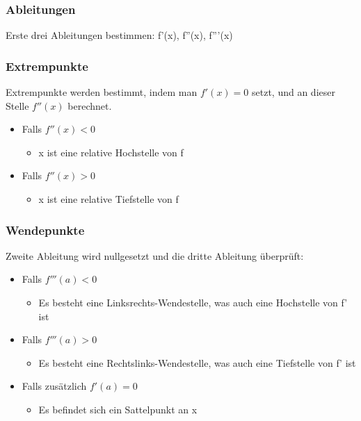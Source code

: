 \documentclass{article}
\begin{document}
	\subsubsection{Ableitungen}
	Erste drei Ableitungen bestimmen: f'(x), f''(x), f'''(x)
	\subsubsection{Extrempunkte}
	Extrempunkte werden bestimmt, indem man $f'(x)=0$ setzt, und an dieser Stelle $f''(x)$ berechnet.
	\begin{itemize}
		\item{Falls $f''(x)<0$}
		\begin{itemize}
			\item{x ist eine relative Hochstelle von f}
		\end{itemize}
		\item{Falls $f''(x)>0$}
		\begin{itemize}
			\item{x ist eine relative Tiefstelle von f}
		\end{itemize}
	\end{itemize}
	\subsubsection{Wendepunkte}
	Zweite Ableitung wird nullgesetzt und die dritte Ableitung überprüft: 
	\begin{itemize}
		\item{Falls $f'''(a)<0$}
		\begin{itemize}
			\item{Es besteht eine Linksrechts-Wendestelle, was auch eine Hochstelle von f' ist}
		\end{itemize}
		\item{Falls $f'''(a)>0$}
		\begin{itemize}
			\item{Es besteht eine Rechtslinks-Wendestelle, was auch eine Tiefstelle von f' ist}
		\end{itemize}
		\item{Falls zusätzlich $f'(a)=0$}
		\begin{itemize}
			\item{Es befindet sich ein Sattelpunkt an x}
		\end{itemize}
	\end{itemize}
\end{document}
